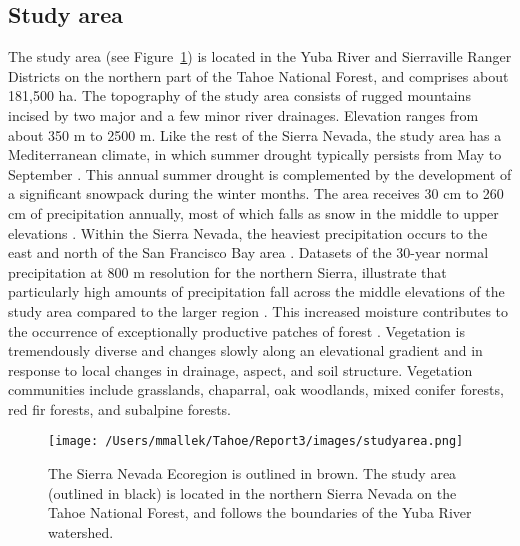 \subsection{Study area}
The study area (see Figure~\ref{projectarea-ch3}) is located in the Yuba River and Sierraville Ranger Districts on the northern part of the Tahoe National Forest, and comprises about 181,500 ha. The topography of the study area consists of rugged mountains incised by two major and a few minor river drainages. Elevation ranges from about 350 m to 2500 m. Like the rest of the Sierra Nevada, the study area has a Mediterranean climate, in which summer drought typically persists from May to September \citep{Minnich2007,Skinner1996}. This annual summer drought is complemented by the development of a significant snowpack during the winter months. The area receives 30 cm to 260 cm of precipitation annually, most of which falls as snow in the middle to upper elevations \citep{Storer1963}. Within the Sierra Nevada, the heaviest precipitation occurs to the east and north of the San Francisco Bay area \citep{VanWag2006}. Datasets of the 30-year normal precipitation at 800 m resolution for the northern Sierra, illustrate that particularly high amounts of precipitation fall across the middle elevations of the study area compared to the larger region \citep{PRISMClimateGroup2004}. This increased moisture contributes to the occurrence of exceptionally productive patches of forest \citep{Littell2012}. Vegetation is tremendously diverse and changes slowly along an elevational gradient and in response to local changes in drainage, aspect, and soil structure. Vegetation communities include grasslands, chaparral, oak woodlands, mixed conifer forests, red fir forests, and subalpine forests.

\begin{figure}
\centering
\texttt{[image: /Users/mmallek/Tahoe/Report3/images/studyarea.png]}
\caption{The Sierra Nevada Ecoregion is outlined in brown. The study area (outlined in black) is located in the northern Sierra Nevada on the Tahoe National Forest, and follows the boundaries of the Yuba River watershed.}
\label{projectarea-ch3}
\end{figure}

